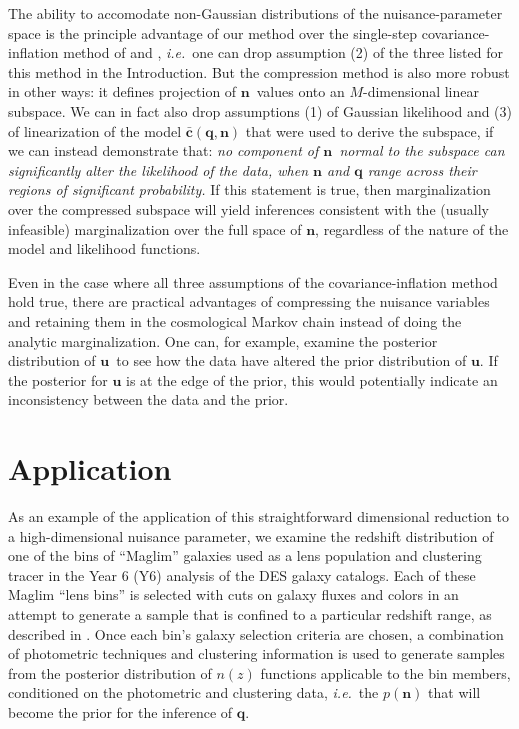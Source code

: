 \documentclass[onecolumn,resetfootnote]{aastex7}
\newcommand{\ie}{\textit{i.e.}}
\newcommand{\eg}{\textit{e.g.}}
\newcommand{\vecq}{\ensuremath{\mathbf{q}}}
\newcommand{\vecn}{\ensuremath{\mathbf{n}}}
\newcommand{\vecu}{\ensuremath{\mathbf{u}}}
\newcommand{\hatc}{\ensuremath{\bar{\mathbf{c}}}}
\begin{document}
The ability to accomodate non-Gaussian distributions of the
nuisance-parameter space is the principle
advantage of our method over the single-step covariance-inflation
method of \citet{bridle02} and \citet{hans}, \ie\ one can drop assumption (2) of the three listed for
this method in the Introduction.
 But the compression method is also more robust in other ways: it defines
   projection of \vecn\ values onto an $M$-dimensional linear subspace.  We can
   in fact also drop assumptions (1) of Gaussian likelihood and (3) of linearization
   of the model $\hatc(\vecq,\vecn)$ that were used to derive the subspace,
   if we can instead demonstrate that: \emph{no component of \vecn\
     normal to the subspace can significantly alter the likelihood of the data,
     when $\vecn$ and $\vecq$ range across their regions of significant
     probability.}  If this statement is true, then marginalization over the
   compressed subspace will yield inferences consistent with the (usually
   infeasible) marginalization over the full space of \vecn, regardless of the
   nature of the model and likelihood functions.  

%
Even in the case where all three assumptions of the covariance-inflation
method hold true, 
there are practical advantages of compressing the nuisance 
variables and retaining them in the cosmological Markov chain instead of doing
the analytic marginalization.   One can, for example, examine the posterior
distribution of \vecu\ to see how the data have altered the prior
  distribution of $\vecu.$  If the posterior for $\vecu$ is at the
edge of the prior, this would potentially indicate an inconsistency between the
data and the prior.
  

\section{Application}\label{sec:app}
As an example of the application of this straightforward dimensional
reduction to a high-dimensional nuisance parameter, we examine the
redshift distribution of one of the bins of ``Maglim''  galaxies used
as a lens population and clustering tracer in the Year 6 (Y6) analysis of
the DES galaxy catalogs.  Each of these Maglim ``lens bins''
is selected with cuts on galaxy fluxes and
colors in an attempt to generate a sample that is confined to a
particular redshift range, as described in \citet{y6maglim}.  Once each bin's
galaxy selection criteria are chosen, a combination of 
photometric techniques \citep{y6lenspz,y6pz} and clustering information
\citep{y6wz} is used to generate samples from the posterior
distribution of  $n(z)$ functions applicable to the bin members, conditioned
on the photometric and clustering data, \ie\ the $p(\vecn)$ that will become the
  prior for the inference of \vecq.
\end{document}
